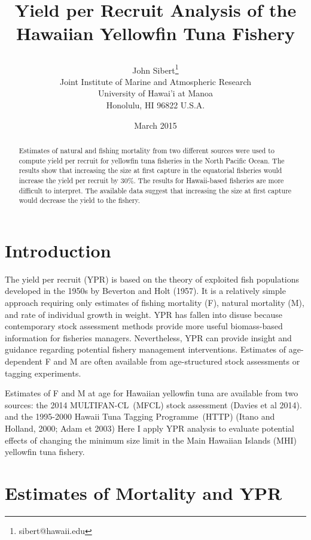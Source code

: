 \documentclass[12pt,letterpaper,twoside]{article}
\title{Yield per Recruit Analysis of the Hawaiian
Yellowfin Tuna Fishery
\date{March 2015}}
\author{
John Sibert\thanks{sibert@hawaii.edu}\\
Joint Institute of Marine and Atmospheric Research\\
University of Hawai'i at Manoa\\
Honolulu, HI  96822 U.S.A.\\[0.125in]
}
\newcommand\MFCL{MULTIFAN-CL}
\newcommand\HTTP{Hawaii Tuna Tagging Programme}
\begin{document}
\maketitle

\begin{abstract}
Estimates of natural and fishing mortality from two different sources
were used to compute yield per recruit for yellowfin tuna fisheries in
the North Pacific Ocean. The results show that increasing the size at
first capture in the equatorial fisheries would increase the yield per
recruit by 30\%. The results for Hawaii-based fisheries are more
difficult to interpret. The available data suggest that increasing the
size at first capture would decrease the yield to the fishery.
\end{abstract}

\section*{Introduction}
The yield per recruit (YPR) is based on the theory of exploited fish
populations developed in the 1950s
by Beverton and Holt (1957). It is a relatively simple
approach requiring only estimates of fishing mortality (F), natural
mortality (M), and rate of individual growth in weight. YPR has fallen into
disuse because contemporary stock assessment methods provide more useful
biomass-based
information for fisheries managers. 
Nevertheless, YPR can provide insight and guidance regarding potential
fishery management interventions.
Estimates of age-dependent F and M are often available from
age-structured stock
assessments or tagging experiments. 

Estimates of F and M at age for Hawaiian yellowfin tuna are available
from two sources: 
the 2014 \MFCL\ (MFCL) stock assessment (Davies et al 2014).
and 
the 1995-2000 \HTTP\ (HTTP) (Itano and Holland, 2000; Adam et 2003) 
Here I
apply YPR analysis to evaluate potential effects of changing the
minimum size limit in the Main Hawaiian Islands (MHI) yellowfin tuna
fishery.

\section*{Estimates of Mortality and YPR}
\end{document}
